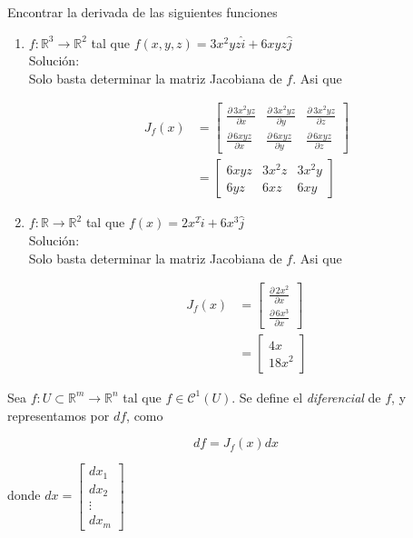\documentclass[letterpaper, 12pt]{article} %
\begin{document}
\newpage
\begin{example}
Encontrar la derivada de las siguientes funciones

\begin{enumerate}
  \item $f: \mathbb{R}^{3} \longrightarrow \mathbb{R}^{2}$ tal que $f(x,y,z) = 3x^{2}yz\hat{i} + 6xyz\hat{j}$\\

  {\sc Solución:}\\
  Solo basta determinar la matriz Jacobiana de $f$. Asi que

  \begin{align*}
  J_{f}(x) &=
  \begin{bmatrix}
  \frac{\partial \, 3x^{2}yz}{\partial x} & \frac{\partial \, 3x^{2}yz}{\partial y} & \frac{\partial \, 3x^{2}yz}{\partial z} \\
  \frac{\partial \, 6xyz}{\partial x} & \frac{\partial \, 6xyz}{\partial y} & \frac{\partial \, 6xyz}{\partial z}
  \end{bmatrix}\\
   &=
  \begin{bmatrix}
  6xyz & 3x^{2}z & 3x^{2}y\\
  6yz & 6xz & 6xy
  \end{bmatrix}
  \end{align*}

  \item $f: \mathbb{R} \longrightarrow \mathbb{R}^{2}$ tal que $f(x) = 2x^{2}\hat{i} + 6x^{3}\hat{j}$\\

  {\sc Solución:}\\
  Solo basta determinar la matriz Jacobiana de $f$. Asi que

  \begin{align*}
  J_{f}(x) &=
  \begin{bmatrix}
  \frac{\partial \, 2x^{2}}{\partial x}\\
  \frac{\partial \, 6x^{3}}{\partial x}
  \end{bmatrix}\\
   &=
  \begin{bmatrix}
  4x\\
  18x^{2}
  \end{bmatrix}
  \end{align*}


\end{enumerate}
\end{example}

\begin{definition}[Diferencial]
Sea $f : U \subset \mathbb{R}^{m} \longrightarrow \mathbb{R}^{n}$ tal que $f \in \mathcal{C}^{1}(U)$. Se
define el {\it diferencial} de $f$, y representamos por $df$, como

$$df = J_{f}(x)dx$$

donde $dx =
\begin{bmatrix}
dx_{1}\\
dx_{2}\\
\vdots\\
dx_{m}
\end{bmatrix}$
\end{definition}
\end{document}
